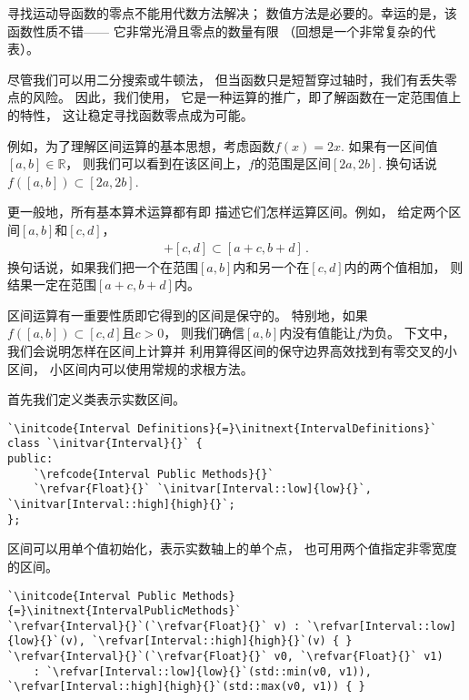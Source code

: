 寻找运动导函数的零点不能用代数方法解决；
数值方法是必要的。幸运的是，该函数性质不错——
它非常光滑且零点的数量有限
（回想是一个非常复杂的代表）。

尽管我们可以用二分搜索或牛顿法，
但当函数只是短暂穿过轴时，我们有丢失零点的风险。
因此，我们使用，
它是一种运算的推广，即了解函数在一定范围值上的特性，
这让稳定寻找函数零点成为可能。

例如，为了理解区间运算的基本思想，考虑函数$f(x)=2x$.
如果有一区间值$[a,b]\in\mathbb{R}$，
则我们可以看到在该区间上，$f$的范围是区间$[2a,2b]$.
换句话说$f([a,b])\subset[2a,2b]$.

更一般地，所有基本算术运算都有即
描述它们怎样运算区间。例如，
给定两个区间$[a,b]$和$[c,d]$，
\begin{align*}
    [a,b]+[c,d]\subset [a+c,b+d]\, .
\end{align*}
换句话说，如果我们把一个在范围$[a,b]$内和另一个在$[c,d]$内的两个值相加，
则结果一定在范围$[a+c,b+d]$内。

区间运算有一重要性质即它得到的区间是保守的。
特别地，如果$f([a,b])\subset[c,d]$且$c>0$，
则我们确信$[a,b]$内没有值能让$f$为负。
下文中，我们会说明怎样在区间上计算并
利用算得区间的保守边界高效找到有零交叉的小区间，
小区间内可以使用常规的求根方法。

首先我们定义类表示实数区间。
\begin{lstlisting}
`\initcode{Interval Definitions}{=}\initnext{IntervalDefinitions}`
class `\initvar{Interval}{}` {
public:
    `\refcode{Interval Public Methods}{}`
    `\refvar{Float}{}` `\initvar[Interval::low]{low}{}`, `\initvar[Interval::high]{high}{}`;
};
\end{lstlisting}

区间可以用单个值初始化，表示实数轴上的单个点，
也可用两个值指定非零宽度的区间。
\begin{lstlisting}
`\initcode{Interval Public Methods}{=}\initnext{IntervalPublicMethods}`
`\refvar{Interval}{}`(`\refvar{Float}{}` v) : `\refvar[Interval::low]{low}{}`(v), `\refvar[Interval::high]{high}{}`(v) { }
`\refvar{Interval}{}`(`\refvar{Float}{}` v0, `\refvar{Float}{}` v1)
    : `\refvar[Interval::low]{low}{}`(std::min(v0, v1)), `\refvar[Interval::high]{high}{}`(std::max(v0, v1)) { }
\end{lstlisting}


